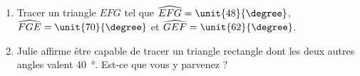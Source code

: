 
\begin{exercice}\label{exo2smath-0071}

\begin{enumerate}
    \item
    Tracer un triangle $EFG$ tel que $\widehat{EFG}=\unit{48}{\degree}$, \( \widehat{FGE}=\unit{70}{\degree}\) et \( \widehat{GEF}=\unit{62}{\degree}\).
\item
    Julie affirme être capable de tracer un triangle rectangle dont les deux autres angles valent \SI{40}{\degree}.  Est-ce que vous y parvenez ?
\end{enumerate}

\end{exercice}
